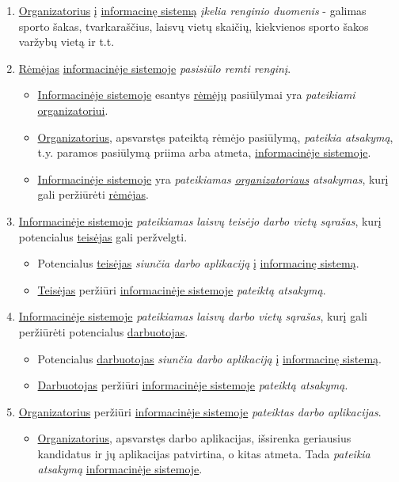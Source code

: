 \documentclass{VUMIFPSkursinis}
\begin{document}
			\begin{enumerate}
				\item \underline{Organizatorius} į \underline{informacinę sistemą} \textit{įkelia renginio duomenis} - galimas sporto šakas, tvarkaraščius, laisvų vietų skaičių, kiekvienos sporto šakos varžybų vietą ir t.t. 
				\item \underline{Rėmėjas} \underline{informacinėje sistemoje} \textit{pasisiūlo remti renginį}. 
				\begin{itemize}
					\item \underline{Informacinėje sistemoje} esantys \underline{rėmėjų} pasiūlymai yra \textit{pateikiami} \underline{organizatoriui}.
					\item \underline{Organizatorius}, apsvarstęs pateiktą rėmėjo pasiūlymą, \textit{pateikia atsakymą}, t.y. paramos pasiūlymą priima arba atmeta, \underline{informacinėje sistemoje}.
					\item \underline{Informacinėje sistemoje} yra \textit{pateikiamas \underline{organizatoriaus} atsakymas}, kurį gali peržiūrėti \underline{rėmėjas}.
				\end{itemize}
				\item \underline{Informacinėje sistemoje} \textit{pateikiamas laisvų teisėjo darbo vietų sąrašas}, kurį potencialus \underline{teisėjas} gali peržvelgti.
				\begin{itemize}
					\item Potencialus \underline{teisėjas} \textit{siunčia darbo aplikaciją} į \underline{informacinę sistemą}.
					\item \underline{Teisėjas} peržiūri \underline{informacinėje sistemoje} \textit{pateiktą atsakymą}.
				\end{itemize}
				\item \underline{Informacinėje sistemoje} \textit{pateikiamas laisvų darbo vietų sąrašas}, kurį gali peržiūrėti potencialus \underline{darbuotojas}.
				\begin{itemize}
					\item Potencialus \underline{darbuotojas} \textit{siunčia darbo aplikaciją} į \underline{informacinę sistemą}.
					\item \underline{Darbuotojas} peržiūri \underline{informacinėje sistemoje} \textit{pateiktą atsakymą}.
				\end{itemize}
				\item \underline{Organizatorius} peržiūri \underline{informacinėje sistemoje} \textit{pateiktas darbo aplikacijas}.
				\begin{itemize}
					\item \underline{Organizatorius}, apsvarstęs darbo aplikacijas, išsirenka geriausius kandidatus ir jų aplikacijas patvirtina, o kitas atmeta. Tada \textit{pateikia atsakymą}  \underline{informacinėje sistemoje}.
				\end{itemize}
			\end{enumerate}
\end{document}
